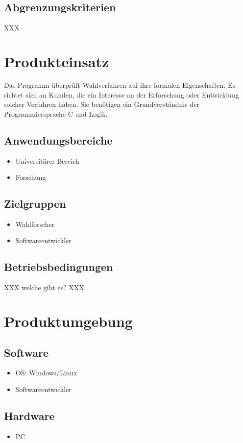 \documentclass[a4paper]{scrreprt}
\begin{document}
\section{Abgrenzungskriterien}
XXX


\chapter{Produkteinsatz}
Das Programm überprüft Wahlverfahren auf ihre formalen Eigenschaften. Es richtet sich an Kunden, die ein Interesse an der Erforschung oder Entwicklung solcher Verfahren haben. Sie benötigen ein Grundverständnis der Programmiersprache C und Logik.

\section{Anwendungsbereiche}
\begin{itemize}
\item Universitärer Bereich
\item Forschung
\end{itemize}

\section{Zielgruppen}
\begin{itemize}
\item Wahlforscher
\item Softwareentwickler
\end{itemize}

\section{Betriebsbedingungen}
XXX welche gibt es? XXX


\chapter{Produktumgebung}

\section{Software}
\begin{itemize}
\item OS: Windows/Linux
\item Softwareentwickler
\end{itemize}

\section{Hardware}
\begin{itemize}
\item PC
\end{itemize}
\end{document}
